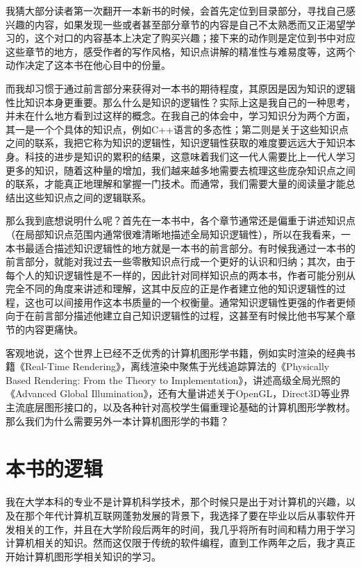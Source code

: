 \preface
{}
\mtcaddchapter 

我猜大部分读者第一次翻开一本新书的时候，会首先定位到目录部分，寻找自己感兴趣的内容，如果发现一些或者甚至部分章节的内容是自己不太熟悉而又正渴望学习的，这个对口的内容基本上决定了购买兴趣；接下来的动作则是定位到书中对应这些章节的地方，感受作者的写作风格，知识点讲解的精准性与难易度等，这两个动作决定了这本书在他心目中的份量。

而我却习惯于通过前言部分来获得对一本书的期待程度，其原因是因为知识的逻辑性比知识本身更重要。那么什么是知识的逻辑性？实际上这是我自己的一种思考，并未在什么地方看到过这样的概念。在我自己的体会中，学习知识分为两个方面，其一是一个个具体的知识点，例如C++语言的多态性；第二则是关于这些知识点之间的联系，我把它称为知识的逻辑性，知识逻辑性获取的难度要远远大于知识本身。科技的进步是知识的累积的结果，这意味着我们这一代人需要比上一代人学习更多的知识，随着这种量的增加，我们越来越多地需要去梳理这些庞杂知识点之间的联系，才能真正地理解和掌握一门技术。而通常，我们需要大量的阅读量才能总结出这些知识点之间的逻辑联系。

那么我到底想说明什么呢？首先在一本书中，各个章节通常还是偏重于讲述知识点（在局部知识点范围内通常很难清晰地描述全局知识逻辑性），所以在我看来，一本书最适合描述知识逻辑性的地方就是一本书的前言部分。有时候我通过一本书的前言部分，就能对我过去一些零散知识点行成一个更好的认识和归纳；其次，由于每个人的知识逻辑性是不一样的，因此针对同样知识点的两本书，作者可能分别从完全不同的角度来讲述和理解，这其中反应的正是作者建立他的知识逻辑性的过程，这也可以间接用作这本书质量的一个权衡量。通常知识逻辑性更强的作者更倾向于在前言部分描述他建立自己知识逻辑性的过程，这甚至有时候比他书写某个章节的内容更痛快。

客观地说，这个世界上已经不乏优秀的计算机图形学书籍，例如实时渲染的经典书籍《Real-Time Rendering》\cite{b:rtr}，离线渲染中聚焦于光线追踪算法的《Physically Based Rendering: From the Theory to Implementation》\cite{b:pbrt}，讲述高级全局光照的《Advanced Global Illumination》\cite{b:AdvancedGlobalIllumination}，还有大量讲述关于OpenGL，Direct3D等业界主流底层图形接口的，以及各种针对高校学生偏重理论基础的计算机图形学教材。那么我们为什么需要另外一本计算机图形学的书籍？



\section*{本书的逻辑}
我在大学本科的专业不是计算机科学技术，那个时候只是出于对计算机的兴趣，以及在那个年代计算机互联网蓬勃发展的背景下，我选择了要在毕业以后从事软件开发相关的工作，并且在大学阶段后两年的时间，我几乎将所有时间和精力用于学习计算机相关的知识。然而这仅限于传统的软件编程，直到工作两年之后，我才真正开始计算机图形学相关知识的学习。

